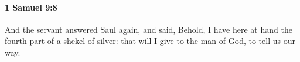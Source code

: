 
		\paragraph{1 Samuel 9:8} %
			\label{1SAMUEL-9-8}

			And the servant answered Saul again, and said, Behold, I have here at hand the fourth part of a shekel of silver: that will I give to the man of God, to tell us our way.


